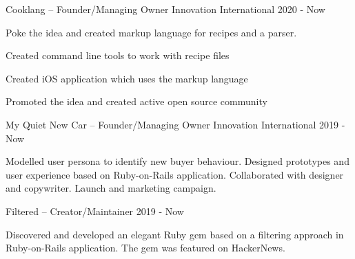 


\begin{cventries}

    \cventry
    {Cooklang – Founder/Managing Owner} %
    {Innovation} %
    {International} %
    {2020 - Now} %
    {
      \begin{cvitems} %
        \item {Poke the idea and created markup language for recipes and a parser.}
        \item {Created command line tools to work with recipe files}
        \item {Created iOS application which uses the markup language}
        \item {Promoted the idea and created active open source community}
      \end{cvitems}
    }

    \cventry
    {My Quiet New Car – Founder/Managing Owner} %
    {Innovation} %
    {International} %
    {2019 - Now} %
    {
      \begin{cvitems} %
        \item {Modelled user persona to identify new buyer behaviour. Designed prototypes and user experience based on Ruby-on-Rails application. Collaborated with designer and copywriter. Launch and marketing campaign.}
      \end{cvitems}
    }

    \cventry
    {Filtered – Creator/Maintainer} %
    {} %
    {} %
    {2019 - Now} %
    {
      \begin{cvitems} %
        \item {Discovered and developed an elegant Ruby gem based on a filtering approach in Ruby-on-Rails application. The gem was featured on HackerNews.}
      \end{cvitems}
    }


\end{cventries}
